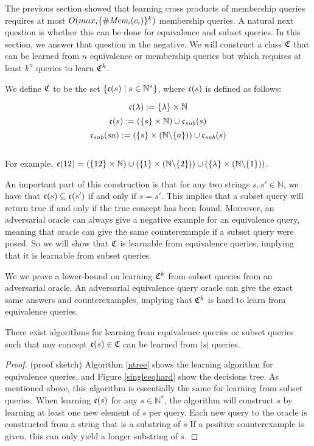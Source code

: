 The previous section showed that learning cross products of membership queries requires at most $O(max_i \{ \#\emph{Mem}_{i}(c_i) \}^k)$ membership queries. 
A natural next question is whether this can be done for equivalence and subset queries. 
In this section, we answer that question in the negative. 
We will construct a class $\mathfrak{C}$ that can be learned from $n$ equivalence or membership queries but which requires at least $k^n$ queries to learn $\mathfrak{C}^k$.  

We define $\mathfrak{C}$ to be the set $\{ \mathfrak{c}(s) \mid s \in \mathbb{N}^* \}$, where $\mathfrak{c}(s)$ is defined as follows:

\[\mathfrak{c}(\lambda) := \{\lambda\} \times \mathbb{N}\]
\[\mathfrak{c}(s) := (\{s\} \times \mathbb{N}) \cup \mathfrak{c}_{sub}(s)\]
\[\mathfrak{c}_{sub}(sa) := (\{s\} \times (\mathbb{N} \backslash \{a\})) \cup \mathfrak{c}_{sub}(s)\]\\

For example, $\mathfrak{c}(12) = (\{12\} \times \mathbb{N}) \cup (\{1\}\times(\mathbb{N} \backslash \{2\}))\cup(\{\lambda\} \times (\mathbb{N} \backslash \{1\}))$.


An important part of this construction is that for any two strings $s,s' \in \mathbb{N}$, we have that $\mathfrak{c}(s) \subseteq \mathfrak{c}(s')$ if and only if $s = s'$. 
This implies that a subset query will return true if and only if the true concept has been found. 
Moreover, an adversarial oracle can always give a negative example for an equivalence query, meaning that oracle can give the same counterexample if a subset query were posed. 
So we will show that $\mathfrak{C}$ is learnable from equivalence queries, implying that it is learnable from subset queries. 

We we prove a lower-bound on learning $\mathfrak{C}^k$ from subset queries from an adversarial oracle. 
An adversarial equivalence query oracle can give the exact same answers and counterexamples, implying that  $\mathfrak{C}^k$ is hard to learn from equivalence queries. 

\begin{proposition}
There exist algorithms for learning from equivalence queries or subset queries such that any concept $\mathfrak{c}(s) \in \mathfrak{C}$ can be learned from $|s|$ queries. 
\end{proposition}
\begin{proof}
(proof sketch) Algorithm \ref{ntree} shows the learning algorithm for equivalence queries, and Figure \ref{singleeqhard} show the decisions tree.  
As mentioned above, this algorithm is essentially the same for learning from subset queries. 
When learning $\mathfrak{c}(s)$ for any $s \in \mathbb{N}^*$, the algorithm will construct $s$ by learning at least one new element of $s$ per query. 
Each new query to the oracle is constructed from a string that is a substring of $s$
If a positive counterexample is given, this can only yield a longer substring of $s$.
\end{proof}


